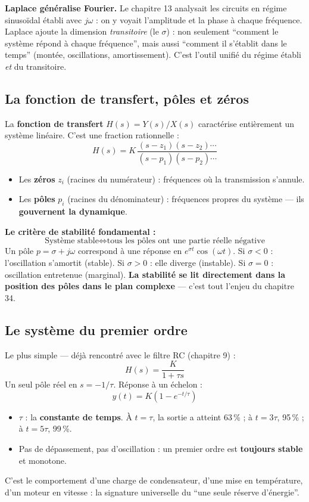 \documentclass[12pt,a4paper,twoside]{book}
\begin{document}
\begin{intuition}
\textbf{Laplace généralise Fourier.} Le chapitre 13 analysait les circuits en régime sinusoïdal établi avec $j\omega$ : on y voyait l'amplitude et la phase à chaque fréquence. Laplace ajoute la dimension \textit{transitoire} (le $\sigma$) : non seulement ``comment le système répond à chaque fréquence'', mais aussi ``comment il s'établit dans le temps'' (montée, oscillations, amortissement). C'est l'outil unifié du régime établi \textit{et} du transitoire.
\end{intuition}

\subsection{La fonction de transfert, pôles et zéros}

\begin{formule}
La \textbf{fonction de transfert} $H(s) = Y(s)/X(s)$ caractérise entièrement un système linéaire. C'est une fraction rationnelle :
\[
H(s) = K\,\frac{(s - z_1)(s - z_2)\cdots}{(s - p_1)(s - p_2)\cdots}
\]
\begin{itemize}[nosep]
\item Les \textbf{zéros} $z_i$ (racines du numérateur) : fréquences où la transmission s'annule.
\item Les \textbf{pôles} $p_i$ (racines du dénominateur) : fréquences propres du système --- ils \textbf{gouvernent la dynamique}.
\end{itemize}

\textbf{Le critère de stabilité fondamental :}
\[
\boxed{\text{Système stable} \iff \text{tous les pôles ont une partie réelle négative}}
\]
Un pôle $p = \sigma + j\omega$ correspond à une réponse en $e^{\sigma t}\cos(\omega t)$. Si $\sigma < 0$ : l'oscillation s'amortit (stable). Si $\sigma > 0$ : elle diverge (instable). Si $\sigma = 0$ : oscillation entretenue (marginal). \textbf{La stabilité se lit directement dans la position des pôles dans le plan complexe} --- c'est tout l'enjeu du chapitre 34.
\end{formule}

\subsection{Le système du premier ordre}

\begin{formule}
Le plus simple --- déjà rencontré avec le filtre RC (chapitre 9) :
\[
H(s) = \frac{K}{1 + \tau s}
\]
Un seul pôle réel en $s = -1/\tau$. Réponse à un échelon :
\[
y(t) = K\left(1 - e^{-t/\tau}\right)
\]
\begin{itemize}[nosep]
\item $\tau$ : la \textbf{constante de temps}. À $t = \tau$, la sortie a atteint 63\,\% ; à $t = 3\tau$, 95\,\% ; à $t = 5\tau$, 99\,\%.
\item Pas de dépassement, pas d'oscillation : un premier ordre est \textbf{toujours stable} et monotone.
\end{itemize}
C'est le comportement d'une charge de condensateur, d'une mise en température, d'un moteur en vitesse : la signature universelle du ``une seule réserve d'énergie''.
\end{formule}
\end{document}
